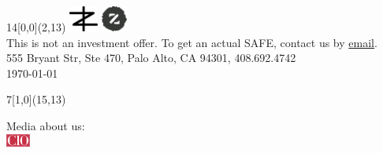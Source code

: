 \documentclass{deck}
\begin{document}
\setlength{\parindent}{0pt} %

\setlength{\fboxsep}{2pt}
\newcommand\point[2]{\vbox{\raggedright\small%
  \fcolorbox{zgreen}{white}{\color{zgreen}#1}\newline%
  \footnotesize#2\vspace{16pt}}}
\newcommand\highlight[1]{{\color{white}{\hl{\thinspace#1\thinspace}}}}

\begin{textblock}{14}[0,0](2,13){
  \color{gray}\footnotesize
  \includegraphics[height=24pt]{../images/zerocracy-logo.pdf}
  \includegraphics[height=24pt]{../images/logo.pdf}\\
  This is not an investment offer. To get an actual SAFE,
  contact us by \href{mailto:cio@zerocracy.com}{email}.\\
  555 Bryant Str, Ste 470, Palo Alto, CA 94301, 408.692.4742\\
  \today\quad\zoldversion
}\end{textblock}

\begin{textblock}{7}[1,0](15,13){\begin{flushright}
  \color{gray}\footnotesize
  Media about us:\\
  \href{https://www.cio.com/article/3326560/artificial-intelligence/workplace-ai-emerging-technologies-ethical-questions.html}{\includegraphics[height=12pt]{../images/cio-logo.pdf}}
\end{flushright}}\end{textblock}
\end{document}
